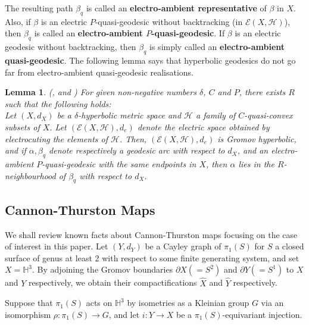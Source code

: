 \documentclass{amsart}
\newtheorem{lemma}[theorem]{Lemma}
\theoremstyle{definition}
\newcommand\HHH{{\mathbb H}}
\newcommand\EE{{\mathcal E}}
\newcommand\HH{{\mathcal H}}
\newcommand\Hyp{{\mathbb H}}
\begin{document}
The resulting
path $\beta_q$ is called an {\bf electro-ambient representative} of $\beta$ in
$X$. Also, if $\beta $ is
an electric  $P$-quasi-geodesic 
without backtracking (in $\EE(X,\HH )$), then $\beta_q$ is called an {\bf electro-ambient $P$-quasi-geodesic}.
If  $\beta $ is
an electric  geodesic  without backtracking, then $\beta_q$ is simply called an {\bf electro-ambient
	quasi-geodesic}.
	The following lemma says that hyperbolic geodesics do not go far from electro-ambient quasi-geodesic realisations. 




\begin{lemma}{\rm (\cite[Proposition 4.3]{klarreich}, \cite[Lemma
	3.10]{mahan-ibdd} and \cite[Lemma 2.5]{mahan-split})}
		For given non-negative numbers $\delta$, $C$ and $P$,  there exists $R$ such that the following
	holds: \\
	Let $(X,d_X)$ be a $\delta$-hyperbolic metric space and $\mathcal{H}$ a
	family of $C$-quasi-convex
	subsets of $X$. Let $(\EE(X,\HH ),d_e)$ denote the electric space obtained by
	electrocuting the elements of $\mathcal{H}$.  Then, $(\EE(X,\HH ),d_e)$ is Gromov hyperbolic, and  if $\alpha , \beta_q$
	denote respectively a geodesic arc with respect to $d_X$, and an electro-ambient
	$P$-quasi-geodesic with the same endpoints in $X$, then $\alpha$ lies in the	$R$-neighbourhood of $\beta_q$ with respect to $d_X$.
	\label{ea-strong}
	\end{lemma}

\subsection{Cannon-Thurston Maps} We shall review known facts about Cannon-Thurston maps focusing on the case of interest in this paper.
Let $(Y,{d_Y})$ be a Cayley graph of $\pi_1(S)$ for $S$ a closed surface of genus at least 2 with respect to some finite generating system, and
set $X = \Hyp^3$.
By
adjoining the Gromov boundaries $\partial{X} (=S^2)$ and $\partial{Y}  (=S^1)$
to $X$ and $Y$ respectively, we obtain their compactifications  $\widehat{X}$ and $\widehat{Y}$ respectively.

Suppose that $\pi_1(S)$ acts on $\HHH^3$ by isometries as a Kleinian group $G$ via an isomorphism $\rho \colon \pi_1(S) \to G$, and  let $ i :Y \rightarrow X$ be a $\pi_1(S)$-equivariant injection.
\end{document}
